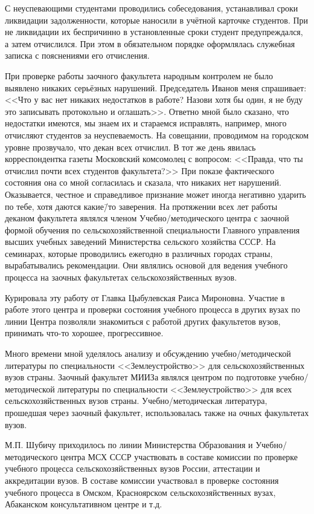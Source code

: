 С неуспевающими студентами проводились собеседования, устанавливал сроки ликвидации задолженности, которые наносили в учётной карточке студентов. При не ликвидации их беспричинно в установленные сроки студент предупреждался, а затем отчислился. При этом в обязательном порядке оформлялась служебная записка с пояснениями его отчисления.

При проверке работы заочного факультета народным контролем не было выявлено никаких серьёзных нарушений. Председатель Иванов меня спрашивает: <<Что у вас нет никаких недостатков в работе? Назови хотя бы один, я не буду это записывать протокольно и оглашать>>. Ответно мной было сказано, что недостатки имеются, мы знаем их и стараемся исправлять, например, много отчисляют студентов за неуспеваемость. На совещании, проводимом на городском уровне прозвучало, что декан всех отчислил. В тот же день явилась корреспондентка газеты Московский комсомолец с вопросом: <<Правда, что ты отчислил почти всех студентов факультета?>> При показе фактического состояния она со мной согласилась и сказала, что никаких нет нарушений. Оказывается, честное и справедливое признание может иногда негативно ударить по тебе, хотя даются какие\=/то заверения. На протяжении всех лет работы деканом факультета являлся членом Учебно\-/методического центра с заочной формой обучения по сельскохозяйственной специальности Главного управления высших учебных заведений Министерства сельского хозяйства СССР. На семинарах, которые проводились ежегодно в различных городах страны, вырабатывались рекомендации. Они являлись основой для ведения учебного процесса на заочных факультетах сельскохозяйственных вузов.

Курировала эту работу от Главка Цыбулевская Раиса Мироновна. Участие в работе этого центра и проверки состояния учебного процесса в других вузах по линии Центра позволяли знакомиться с работой других факультетов вузов, принимать что-то хорошее, прогрессивное.

Много времени мной уделялось анализу и обсуждению учебно\-/методической литературы по специальности <<Землеустройство>> для сельскохозяйственных вузов страны. Заочный факультет МИИЗа являлся центром по подготовке учебно\-/методической литературы по специальности <<Землеустройство>> для всех сельскохозяйственных вузов страны. Учебно\-/методическая литература, прошедшая через заочный факультет, использовалась также на очных факультетах вузов.

М.П. Шубичу приходилось по линии Министерства Образования и Учебно\-/методического центра МСХ СССР участвовать в составе комиссии по проверке учебного процесса сельскохозяйственных вузов России, аттестации и аккредитации вузов. В составе комиссии участвовал в проверке состояния учебного процесса в Омском, Красноярском сельскохозяйственных вузах, Абаканском консультативном центре и т.д.

